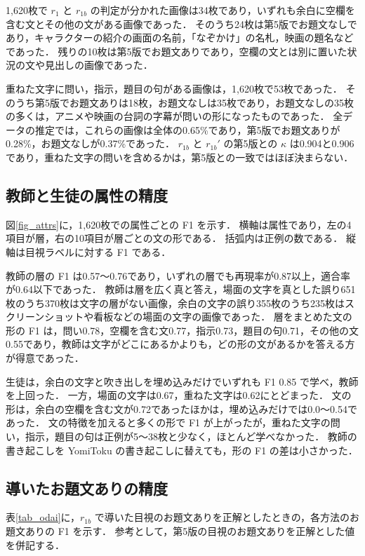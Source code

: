 1,620枚で $ r_1 $ と $ r_{1b} $ の判定が分かれた画像は34枚であり，いずれも余白に空欄を含む文とその他の文がある画像であった．
そのうち24枚は第5版でお題文なしであり，キャラクターの紹介の画面の名前，「なぞかけ」の名札，映画の題名などであった．
残りの10枚は第5版でお題文ありであり，空欄の文とは別に置いた状況の文や見出しの画像であった．

重ねた文字に問い，指示，題目の句がある画像は，1,620枚で53枚であった．
そのうち第5版でお題文ありは18枚，お題文なしは35枚であり，お題文なしの35枚の多くは，アニメや映画の台詞の字幕が問いの形になったものであった．
全データの推定では，これらの画像は全体の0.65\%であり，第5版でお題文ありが0.28\%，お題文なしが0.37\%であった．
$ r_{1b} $ と $ r_{1b}' $ の第5版との $ \kappa $ は0.904と0.906であり，重ねた文字の問いを含めるかは，第5版との一致ではほぼ決まらない．

\subsection{教師と生徒の属性の精度}
図\ref{fig_attrs}に，1,620枚での属性ごとの F1 を示す．
横軸は属性であり，左の4項目が層，右の10項目が層ごとの文の形である．
括弧内は正例の数である．
縦軸は目視ラベルに対する F1 である．

教師の層の F1 は0.57〜0.76であり，いずれの層でも再現率が0.87以上，適合率が0.64以下であった．
教師は層を広く真と答え，場面の文字を真とした誤り651枚のうち370枚は文字の層がない画像，余白の文字の誤り355枚のうち235枚はスクリーンショットや看板などの場面の文字の画像であった．
層をまとめた文の形の F1 は，問い0.78，空欄を含む文0.77，指示0.73，題目の句0.71，その他の文0.55であり，教師は文字がどこにあるかよりも，どの形の文があるかを答える方が得意であった．

生徒は，余白の文字と吹き出しを埋め込みだけでいずれも F1 0.85 で学べ，教師を上回った．
一方，場面の文字は0.67，重ねた文字は0.62にとどまった．
文の形は，余白の空欄を含む文が0.72であったほかは，埋め込みだけでは0.0〜0.54であった．
文の特徴を加えると多くの形で F1 が上がったが，重ねた文字の問い，指示，題目の句は正例が5〜38枚と少なく，ほとんど学べなかった．
教師の書き起こしを YomiToku の書き起こしに替えても，形の F1 の差は小さかった．

\subsection{導いたお題文ありの精度}
表\ref{tab_odai}に，$ r_{1b} $ で導いた目視のお題文ありを正解としたときの，各方法のお題文ありの F1 を示す．
参考として，第5版の目視のお題文ありを正解とした値を併記する．

